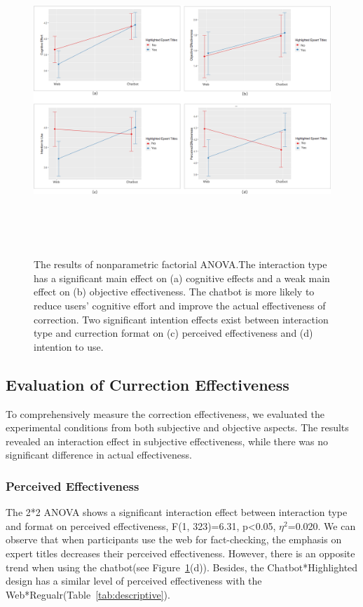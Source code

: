     \begin{figure}
        \centering
          \includegraphics[width=\textwidth,height=4.6in]{figs/fig_main_interaction.png}
        \caption{The results of nonparametric factorial ANOVA.The interaction type has a significant main effect on (a) cognitive effects and a weak main effect on (b) objective effectiveness. 
        The chatbot is more likely to reduce users' cognitive effort and improve the actual effectiveness of correction.
        Two significant intention effects exist between interaction type and currection format on (c) perceived effectiveness and (d) intention to use.}
        \label{FIG:interaction}
    \end{figure}

\subsection{Evaluation of Currection Effectiveness}
To comprehensively measure the correction effectiveness, we evaluated the experimental conditions from both subjective and objective aspects.
The results revealed an interaction effect in subjective effectiveness, while there was no significant difference in actual effectiveness.

\subsubsection{Perceived Effectiveness}
The 2*2 ANOVA shows a significant interaction effect between interaction type and format on perceived effectiveness, F(1, 323)=6.31, p<0.05, $\eta^{2}$=0.020.
We can observe that when participants use the web for fact-checking, the emphasis on expert titles decreases their perceived effectiveness.
However, there is an opposite trend when using the chatbot(see Figure~\ref{FIG:interaction}(d)).
Besides, the Chatbot*Highlighted design has a similar level of perceived effectiveness with the Web*Regualr(Table~\ref{tab:descriptive}).


